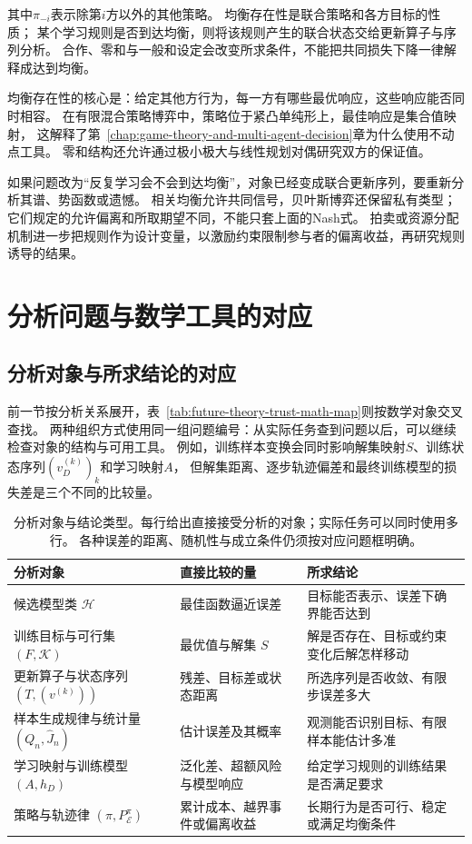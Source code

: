 其中$\pi_{-i}$表示除第$i$方以外的其他策略。
均衡存在性是联合策略和各方目标的性质；
某个学习规则是否到达均衡，则将该规则产生的联合状态交给更新算子与序列分析。
合作、零和与一般和设定会改变所求条件，不能把共同损失下降一律解释成达到均衡。

均衡存在性的核心是：给定其他方行为，每一方有哪些最优响应，这些响应能否同时相容。
在有限混合策略博弈中，策略位于紧凸单纯形上，最佳响应是集合值映射，
这解释了第~\ref{chap:game-theory-and-multi-agent-decision}章为什么使用不动点工具。
零和结构还允许通过极小极大与线性规划对偶研究双方的保证值。

如果问题改为“反复学习会不会到达均衡”，对象已经变成联合更新序列，要重新分析其谱、势函数或遗憾。
相关均衡允许共同信号，贝叶斯博弈还保留私有类型；它们规定的允许偏离和所取期望不同，不能只套上面的Nash式。
拍卖或资源分配机制进一步把规则作为设计变量，以激励约束限制参与者的偏离收益，再研究规则诱导的结果。

\section{分析问题与数学工具的对应}
\label{sec:future-mathematical-tool-roles}

\subsection{分析对象与所求结论的对应}
\label{sec:future-object-conclusion-correspondence}

前一节按分析关系展开，表~\ref{tab:future-theory-trust-math-map}则按数学对象交叉查找。
两种组织方式使用同一组问题编号：从实际任务查到问题以后，可以继续检查对象的结构与可用工具。
例如，训练样本变换会同时影响解集映射$S$、训练状态序列$(v_D^{(k)})_k$和学习映射$A$，
但解集距离、逐步轨迹偏差和最终训练模型的损失差是三个不同的比较量。

\begin{table}[htbp]
  \centering
  \begin{tabularx}{\linewidth}{lXX}
    \toprule
    分析对象 & 直接比较的量 & 所求结论\\
    \midrule
    候选模型类 $\mathcal H$ & 最佳函数逼近误差 & 目标能否表示、误差下确界能否达到\\
    训练目标与可行集 $(F,\mathcal K)$ & 最优值与解集 $S$ & 解是否存在、目标或约束变化后解怎样移动\\
    更新算子与状态序列 $(T,(v^{(k)}))$ & 残差、目标差或状态距离 & 所选序列是否收敛、有限步误差多大\\
    样本生成规律与统计量 $(Q_n,\widehat J_n)$ & 估计误差及其概率 & 观测能否识别目标、有限样本能估计多准\\
    学习映射与训练模型 $(A,h_D)$ & 泛化差、超额风险与模型响应 & 给定学习规则的训练结果是否满足要求\\
    策略与轨迹律 $(\pi,P_{\mathcal E}^{\pi})$ & 累计成本、越界事件或偏离收益 & 长期行为是否可行、稳定或满足均衡条件\\
    \bottomrule
  \end{tabularx}
  \caption{分析对象与结论类型。每行给出直接接受分析的对象；实际任务可以同时使用多行。
  各种误差的距离、随机性与成立条件仍须按对应问题框明确。}
  \label{tab:future-object-conclusion-types}
\end{table}


